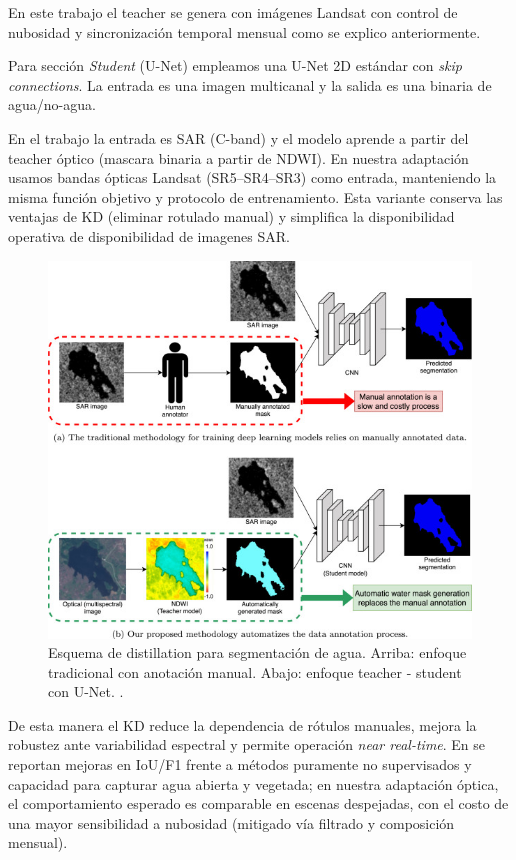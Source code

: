 En este trabajo el teacher se genera con imágenes Landsat con control de nubosidad y sincronización temporal mensual como se explico anteriormente.

Para sección \textit{Student} (U-Net) empleamos una U-Net 2D estándar con \emph{skip connections}. La entrada es una imagen multicanal y la salida es una binaria de agua/no-agua. 

En el trabajo \cite{DeepAqua2023} la entrada es SAR (C-band) y el modelo aprende a partir del teacher óptico (mascara binaria a partir de NDWI). En nuestra adaptación usamos bandas ópticas Landsat (SR5--SR4--SR3) como entrada, manteniendo la misma función objetivo y protocolo de entrenamiento. Esta variante conserva las ventajas de KD (eliminar rotulado manual) y simplifica la disponibilidad operativa de disponibilidad de imagenes SAR.

\begin{figure}[t]
  \centering
  \includegraphics[scale=0.7]{Figures/KD_deepaqua.jpg}
  \caption{Esquema de distillation para segmentación de agua. Arriba: enfoque tradicional con anotación manual. Abajo: enfoque teacher - student con U-Net. \protect\footnotemark.}
  \label{fig:kd-water}
\end{figure}


De esta manera el KD reduce la dependencia de rótulos manuales, mejora la robustez ante variabilidad espectral y permite operación \emph{near real-time}. En \cite{DeepAqua2023} se reportan mejoras en IoU/F1 frente a métodos puramente no supervisados y capacidad para capturar agua abierta y vegetada; en nuestra adaptación óptica, el comportamiento esperado es comparable en escenas despejadas, con el costo de una mayor sensibilidad a nubosidad (mitigado vía filtrado y composición mensual).



